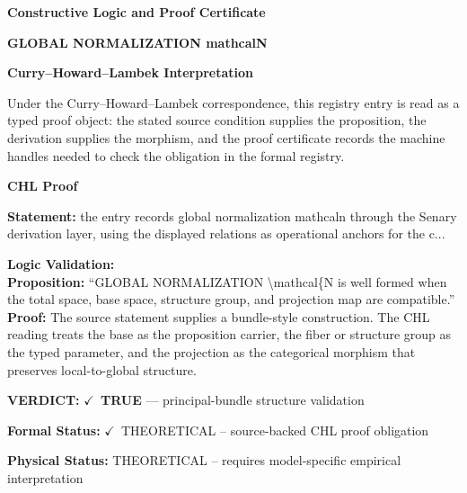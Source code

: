 \clearpage
\begingroup\tzpsupportsetup
\noindent\textbf{\fontsize{10.8pt}{12.8pt}\selectfont [ID 0564] Constructive Logic and Proof Certificate}\par
\noindent\textbf{\fontsize{10pt}{12pt}\selectfont GLOBAL NORMALIZATION mathcalN}\par
\vspace{0.45em}
\begingroup
\footnotesize
\setlength{\parskip}{0.22em}
\setlength{\parindent}{0pt}
\noindent\textbf{Curry--Howard--Lambek Interpretation}\par
Under the Curry--Howard--Lambek correspondence, this registry entry is read as a typed proof
object: the stated source condition supplies the proposition, the derivation supplies the
morphism, and the proof certificate records the machine handles needed to check the obligation
in the formal registry.

\vspace{0.45em}
\noindent\textbf{CHL Proof}\par
\textbf{Statement:} the entry records global normalization mathcaln through the Senary derivation layer,
using the displayed relations as operational anchors for the c...

\textbf{Logic Validation:}\\
\textbf{Proposition:} ``GLOBAL NORMALIZATION \textbackslash{}mathcal\{N is well formed when the total space, base space,
structure group, and projection map are compatible.''\\
\textbf{Proof:} The source statement supplies a bundle-style construction. The CHL reading treats the
base as the proposition carrier, the fiber or structure group as the typed parameter,
and the projection as the categorical morphism that preserves local-to-global structure.

\textbf{VERDICT:} \ensuremath{\checkmark}\ \textbf{TRUE} --- principal-bundle structure validation

\textbf{Formal Status:} \ensuremath{\checkmark}\ THEORETICAL -- source-backed CHL proof obligation

\textbf{Physical Status:} THEORETICAL -- requires model-specific empirical interpretation
\par\vspace{0.45em}
\par
\ifTZPDarkEdition
{}
\fi
\endgroup
\endgroup
